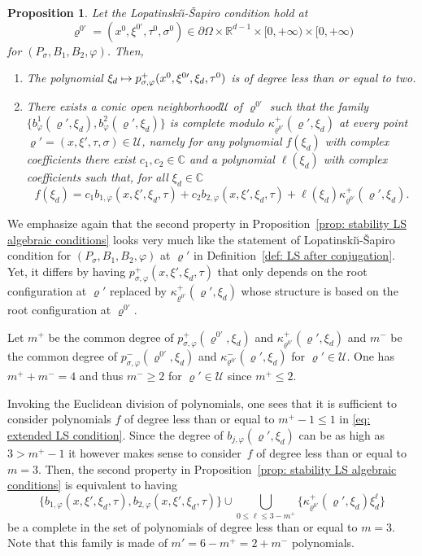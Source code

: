 \documentclass[JEP,XML,SOM,Unicode,published]{cedram}
\newcommand\mto{\mathchoice{\longmapsto}{\mapsto}{\mapsto}{\mapsto}}
\theoremstyle{plain}
\newtheorem{proposition}[theorem]{Proposition}
\theoremstyle{definition}
\def\R{\mathbb{R}}
\def\C{\mathbb{C}}
\newcommand{\LS}{Lopatinski\u{\i}-\v{S}apiro\xspace}
\newcommand{\nhd}{neighborhood\xspace}
\let\k\kappa
\let\y\varrho
\newcommand{\U}{\mathscr U}
\newcommand{\Psig}{P_{\sigma}}
\newcommand{\pconj}{p_{\sigma,\varphi}}
\begin{document}
\begin{proposition}
\label{prop: stability LS algebraic conditions}
Let the \LS condition hold at
\[
\y^{0\prime} = (x^0, \xi^{0\prime}, \tau^0, \sigma^0)\in \partial
\Omega \times \R^{d-1}\times [0,+\infty) \times [0,+\infty)
\]
for
$(\Psig, B_1, B_2, \varphi)$. Then,
\begin{enumerate}
\item The polynomial
$\xi_d \mto \pconj^+(x^0,
\xi^{0\prime}, \xi_d, \tau^0)$ is of degree less than or equal to
two.
\item There exists a conic open \nhd $\U$ of $\y^{0\prime}$ such that
the family
$\{b^1_{\varphi}(\y',\xi_d),b^2_{\varphi}(\y',\xi_d)\}$ is complete
modulo $\k^+_{\y^{0\prime}} (\y',\xi_d)$ at every point \hbox{$\y' \!=\! (x,\xi',
\tau, \sigma)\!\in\!\U\!\!$,}
namely for
any polynomial $f(\xi_d)$ with complex coefficients there
exist $c_1, c_2\in\C$ and a polynomial
$\ell(\xi_d)$ with complex coefficients such that, for all
$\xi_d\in\C$
\begin{equation}
\label{eq: extended LS condition}
f(\xi_d)=c_1 b_{1,\varphi}(x,\xi',\xi_d,\tau)
+c_2b_{2,\varphi}(x,\xi',\xi_d,\tau)
+\ell(\xi_d) \k^+_{\y^{0\prime}}(\y',\xi_d).
\end{equation}
\end{enumerate}
\end{proposition}
We emphasize again that the second property in Proposition~\ref{prop:
stability LS algebraic conditions} looks very much like the
statement of \LS condition for $(\Psig, B_1, B_2, \varphi)$ at $\y'$
in Definition~\ref{def: LS after conjugation}. Yet, it differs by
having $\pconj^+(x,\xi',\xi_d,\tau)$ that only depends on the root configuration at $\y'$ replaced
by $ \k^+_{\y^{0\prime}}(\y',\xi_d)$ whose structure is based on the
root configuration at $\y^{0\prime}$.

Let $m^+$ be the common degree of $\pconj^+(\y^{0\prime},\xi_d)$ and
$\k^+_{\y^{0\prime}} (\y',\xi_d)$ and
$m^-$ be the common degree of $\pconj^-(\y^{0\prime},\xi_d)$ and
$\k^-_{\y^{0\prime}} (\y',\xi_d)$ for $\y'\in \U$. One has $m^+ + m^-
= 4$ and thus $m^- \geq 2$ for $\y'\in \U$ since $m^+ \leq 2$.

Invoking the Euclidean division of polynomials, one sees that it is
sufficient to consider polynomials $f$ of degree less than or equal to
$m^+-1\leq 1$ in \eqref{eq: extended LS condition}.
Since the degree of $b_{j,\varphi} (\y',\xi_d)$ can be as high as
$3> m^+-1$ it however makes sense to consider~$f$ of degree less than or equal to
$m=3$. Then, the second property in Proposition~\ref{prop:
stability LS algebraic conditions} is equivalent to having
\begin{equation*}
\{ b_{1,\varphi}(x,\xi',\xi_d,\tau),
b_{2,\varphi}(x,\xi',\xi_d,\tau)\} \cup \bigcup_{0 \leq \ell \leq
3- m^+} \{
\k^+_{\y^{0\prime}}(\y',\xi_d) \xi_d^\ell\}
\end{equation*}
be a complete in the set of polynomials of degree less than or equal to
$m=3$. Note that this family is made of $m' = 6- m^+ = 2 + m^-$
polynomials.
\end{document}
